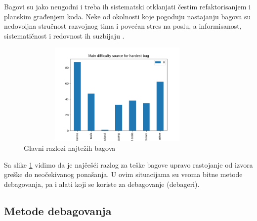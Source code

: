 \documentclass[a4paper]{article}
\begin{document}
Bagovi su jako neugodni i treba ih sistematski otklanjati čestim refaktorisanjem i planskim građenjem koda. Neke od okolnosti koje pogoduju nastajanju bagova su nedovoljna stručnost razvojnog tima i povećan stres na poslu, a informisanost, sistematičnost i redovnost ih suzbijaju \cite{bagovi_smalkov}.

\begin{figure}[h!]
	\begin{center}
		\includegraphics[width=100mm,height=50mm]{Slike/bagovi.png}
	\end{center}
	\caption{Glavni razlozi najtežih bagova \cite{study_bugs}}
	\label{fig:bagovi}
\end{figure}

Sa slike \ref{fig:bagovi} vidimo da je najčešći razlog za teške bagove upravo rastojanje od izvora greške do neočekivanog ponašanja. U ovim situacijama su veoma bitne metode debagovanja, pa i alati koji se koriste za debagovanje (debageri).

\subsection{Metode debagovanja}
\label{subsec:podnaslov2}
\end{document}
